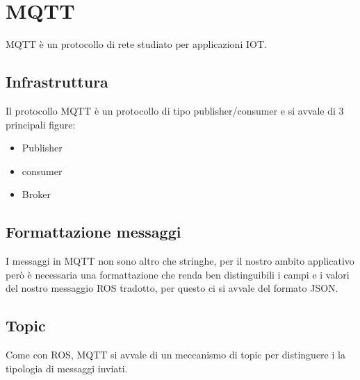 \section{MQTT}
MQTT è un protocollo di rete studiato per applicazioni IOT.
\subsection{Infrastruttura}
Il protocollo MQTT è un protocollo di tipo publisher/consumer e si avvale di 3 principali figure:
\begin{itemize}
  \item Publisher
  \item consumer
  \item Broker
\end{itemize}
\subsection{Formattazione messaggi}
I messaggi in MQTT non sono altro che stringhe, per il nostro ambito applicativo però è necessaria una formattazione che renda ben distinguibili i campi e i valori del nostro messaggio ROS tradotto, per questo ci si avvale del formato JSON.
\subsection{Topic}
Come con ROS, MQTT si avvale di un meccanismo di topic per distinguere i la tipologia di messaggi inviati.
